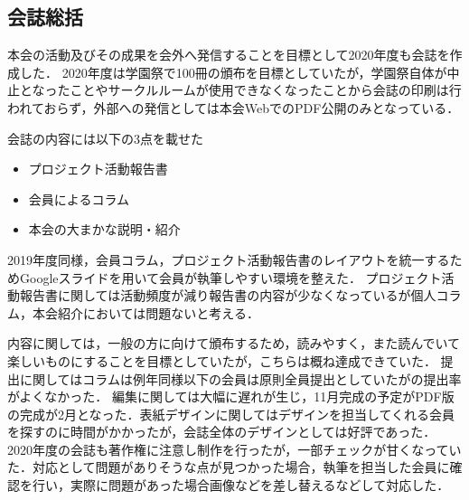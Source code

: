 \subsection*{会誌総括}

本会の活動及びその成果を会外へ発信することを目標として2020年度も会誌を作成した．
2020年度は学園祭で100冊の頒布を目標としていたが，学園祭自体が中止となったことやサークルルームが使用できなくなったことから会誌の印刷は行われておらず，外部への発信としては本会WebでのPDF公開のみとなっている．

会誌の内容には以下の3点を載せた

\begin{itemize}
    \item プロジェクト活動報告書
    \item 会員によるコラム
    \item 本会の大まかな説明・紹介
\end{itemize}

2019年度同様，会員コラム，プロジェクト活動報告書のレイアウトを統一するためGoogleスライドを用いて会員が執筆しやすい環境を整えた．
プロジェクト活動報告書に関しては活動頻度が減り報告書の内容が少なくなっているが個人コラム，本会紹介においては問題ないと考える．

内容に関しては，一般の方に向けて頒布するため，読みやすく，また読んでいて楽しいものにすることを目標としていたが，こちらは概ね達成できていた．
提出に関してはコラムは例年同様\thirdGrade{}以下の会員は原則全員提出としていたが\thirdGrade{}の提出率がよくなかった．
編集に関しては大幅に遅れが生じ，11月完成の予定がPDF版の完成が2月となった．表紙デザインに関してはデザインを担当してくれる会員を探すのに時間がかかったが，会誌全体のデザインとしては好評であった．
2020年度の会誌も著作権に注意し制作を行ったが，一部チェックが甘くなっていた．対応として問題がありそうな点が見つかった場合，執筆を担当した会員に確認を行い，実際に問題があった場合画像などを差し替えるなどして対応した．
